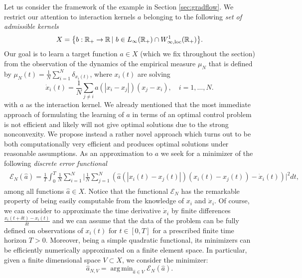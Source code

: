 \documentclass[A4paper,11pt]{article}
\theoremstyle{definition}
\newcommand{\loc}{\textup{loc}}
\newcommand{\R}{\mathbb{R}}
\DeclareMathOperator{\argmin}{arg\,min}
\begin{document}
Let us consider the framework of the example in Section \ref{sec:gradflow}. We restrict our attention to interaction kernels $a$ belonging to the following \textit{set of admissible kernels}
\begin{align*}
	X=\bigl\{b:\R_+\rightarrow\R\,|\ b \in L_{\infty}(\R_+) \cap W^{1}_{\infty,\loc}(\R_+) \bigr \}.
\end{align*}
Our goal is to learn a target function $a \in X$ (which we fix throughout the section) from the observation of the dynamics of the empirical measure $\mu_N$ that is defined by $\mu_N(t)=\frac{1}{N} \sum_{i=1}^N \delta_{x_i(t)}$, where $x_i(t)$ are solving
\begin{equation}\label{fdgradientflow2}
\dot x_i(t) = \frac{1}{N} \sum_{j \neq i} a(| x_i -  x_j |) (x_j - x_i), \quad i=1,\dots,N.
\end{equation}
with $a$ as the interaction kernel. We already mentioned that the  most immediate approach of formulating the learning of $a$ in terms of an optimal control problem is not efficient and likely will not give optimal solutions due to the strong nonconvexity. We propose instead a rather novel approach which turns out to be both computationally very efficient and   produces optimal solutions under reasonable assumptions. As an approximation to $a$ we seek for a minimizer of the following \textit{discrete error functional}
\begin{align}\label{eq-def-error1}
	\begin{split}
	\mathcal E_N(\widehat a) = \frac{1}{T}\int_0^T\frac{1}{N}\sum_{i=1}^N\biggl|\frac{1}{N}\sum_{j=1}^N
			\left(\widehat a(|x_i(t)-x_j(t)|)(x_i(t) - x_j(t))-\dot{x}_i(t)\right)\biggr|^2 dt,
	\end{split}
\end{align}
among all functions $\widehat a \in X$. Notice that the functional $\mathcal E_N$ has the remarkable property of being easily computable from the knowledge of $x_i$ and $\dot{x}_i$. Of course, we can consider to approximate the time derivative $\dot{x}_i$ by finite differences $\frac{x_i(t+\delta t)- x_i(t)}{\delta t}$ and we can assume that the data of the problem can be fully defined on observations of $x_i(t)$ for $t \in [0,T]$ for a prescribed finite time horizon $T>0$. Moreover, being a simple quadratic functional, its minimizers can be efficiently numerically approximated on a finite element space. In particular, given a finite dimensional space $V \subset X$, we consider the minimizer:
\begin{equation}\label{fdproxy}
\widehat a_{N,V} = \argmin_{\widehat a \in V} \mathcal E_N(\widehat a).
\end{equation}
\end{document}
